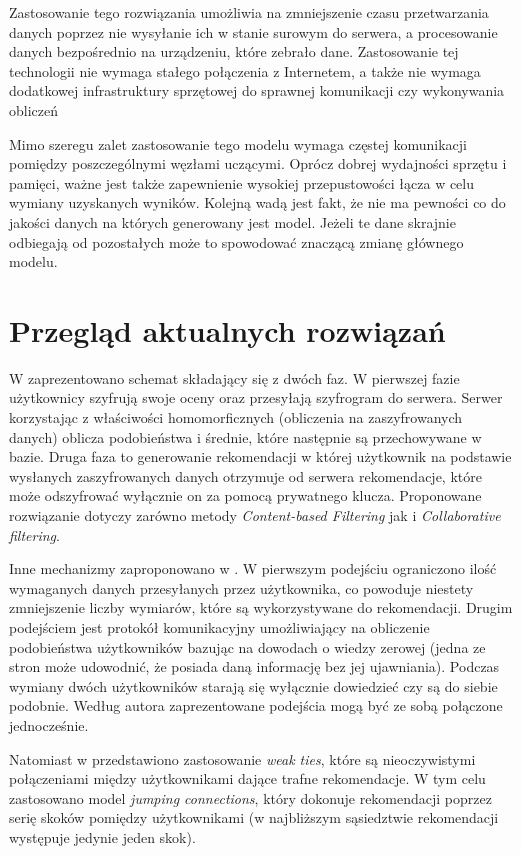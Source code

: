 Zastosowanie tego rozwiązania umożliwia na zmniejszenie czasu przetwarzania danych poprzez nie wysyłanie ich w stanie surowym do serwera, a procesowanie danych bezpośrednio na urządzeniu, które zebrało dane. Zastosowanie tej technologii nie wymaga stałego połączenia z Internetem, a także nie wymaga dodatkowej infrastruktury sprzętowej do sprawnej komunikacji czy wykonywania obliczeń

Mimo szeregu zalet zastosowanie tego modelu wymaga częstej komunikacji pomiędzy poszczególnymi węzłami uczącymi. Oprócz dobrej wydajności sprzętu i pamięci, ważne jest także zapewnienie wysokiej przepustowości łącza w celu wymiany uzyskanych wyników. Kolejną wadą jest fakt, że nie ma pewności co do jakości danych na których generowany jest model. Jeżeli te dane skrajnie odbiegają od pozostałych może to spowodować znaczącą zmianę głównego modelu.

\section{Przegląd aktualnych rozwiązań}

W \cite{practicalPrivacy} zaprezentowano schemat składający się z dwóch faz. W pierwszej fazie użytkownicy szyfrują swoje oceny oraz przesyłają szyfrogram do serwera. Serwer korzystając z właściwości homomorficznych (obliczenia na zaszyfrowanych danych) oblicza podobieństwa i średnie, które następnie są przechowywane w bazie. Druga faza to generowanie rekomendacji w której użytkownik na podstawie wysłanych zaszyfrowanych danych otrzymuje od serwera rekomendacje, które może odszyfrować wyłącznie on za pomocą prywatnego klucza. Proponowane rozwiązanie dotyczy zarówno metody \textit{Content-based Filtering} jak i \textit{Collaborative filtering}.

Inne mechanizmy zaproponowano w \cite{contributionsToSecurityRS}. W pierwszym podejściu ograniczono ilość wymaganych danych przesyłanych przez użytkownika, co powoduje niestety zmniejszenie liczby wymiarów, które są wykorzystywane do rekomendacji. Drugim podejściem jest protokół komunikacyjny umożliwiający na obliczenie podobieństwa użytkowników bazując na dowodach o wiedzy zerowej (jedna ze stron może udowodnić, że posiada daną informację bez jej ujawniania). Podczas wymiany dwóch użytkowników starają się wyłącznie dowiedzieć czy są do siebie podobnie. Według autora zaprezentowane podejścia mogą być ze sobą połączone jednocześnie.

Natomiast w \cite{weakTies} przedstawiono zastosowanie \textit{weak ties}, które są nieoczywistymi połączeniami między użytkownikami dające trafne rekomendacje. W tym celu zastosowano model \textit{jumping connections}, który dokonuje rekomendacji poprzez serię skoków pomiędzy użytkownikami (w najbliższym sąsiedztwie rekomendacji występuje jedynie jeden skok).

